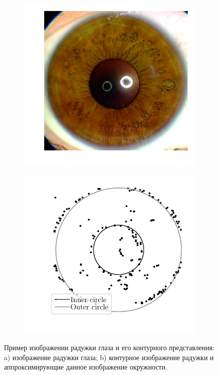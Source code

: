 \documentclass[12pt, twoside]{article}
\numberwithin{equation}{section}
\begin{document}
\begin{figure}[h!]
     \centering
     \begin{subfigure}[b]{0.3\textwidth}
         \centering
         \includegraphics[width=\textwidth]{figures/real_image}
         \caption{}
         \label{intro:fig1:real}
     \end{subfigure}
     \begin{subfigure}[b]{0.3\textwidth}
         \centering
         \includegraphics[width=\textwidth]{figures/outline_image}
         \caption{}
         \label{intro:fig1:outer}
     \end{subfigure}
     \caption{Пример изображении радужки глаза и его контурного представления: a) изображение радужки глаза; b) контурное изображение радужки и аппроксимирующие данное изображение окружности.}
    \label{intro:fig1}
\end{figure}
\end{document}
